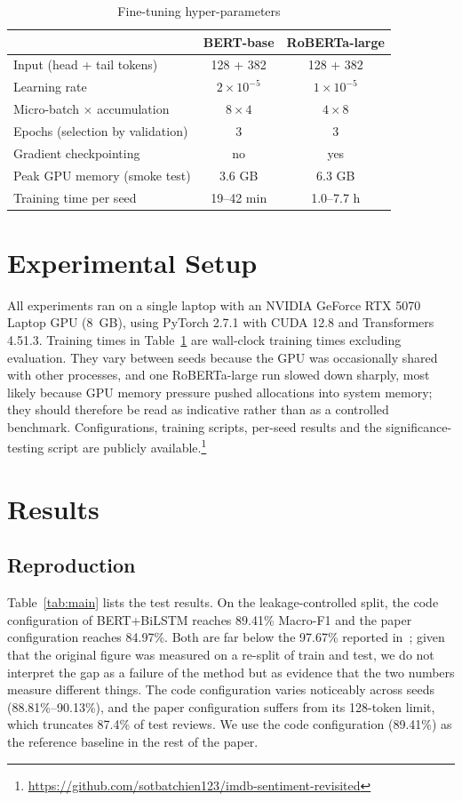 \documentclass[conference]{IEEEtran}
\begin{document}
\begin{table}[t]
\caption{Fine-tuning hyper-parameters}
\label{tab:hparams}
\centering
\begin{tabular}{lcc}
\toprule
 & BERT-base & RoBERTa-large \\
\midrule
Input (head + tail tokens) & 128 + 382 & 128 + 382 \\
Learning rate & $2\times10^{-5}$ & $1\times10^{-5}$ \\
Micro-batch $\times$ accumulation & $8\times4$ & $4\times8$ \\
Epochs (selection by validation) & 3 & 3 \\
Gradient checkpointing & no & yes \\
Peak GPU memory (smoke test) & 3.6 GB & 6.3 GB \\
Training time per seed & 19--42 min & 1.0--7.7 h \\
\bottomrule
\end{tabular}
\end{table}

\section{Experimental Setup}
All experiments ran on a single laptop with an NVIDIA GeForce RTX 5070 Laptop GPU (8~GB), using PyTorch 2.7.1 with CUDA 12.8 and Transformers 4.51.3. Training times in Table~\ref{tab:hparams} are wall-clock training times excluding evaluation. They vary between seeds because the GPU was occasionally shared with other processes, and one RoBERTa-large run slowed down sharply, most likely because GPU memory pressure pushed allocations into system memory; they should therefore be read as indicative rather than as a controlled benchmark. Configurations, training scripts, per-seed results and the significance-testing script are publicly available.\footnote{\url{https://github.com/sotbatchien123/imdb-sentiment-revisited}}

\section{Results}

\subsection{Reproduction}
Table~\ref{tab:main} lists the test results. On the leakage-controlled split, the code configuration of BERT+BiLSTM reaches 89.41\% Macro-F1 and the paper configuration reaches 84.97\%. Both are far below the 97.67\% reported in~\cite{nkhata2023}; given that the original figure was measured on a re-split of train and test, we do not interpret the gap as a failure of the method but as evidence that the two numbers measure different things. The code configuration varies noticeably across seeds (88.81\%--90.13\%), and the paper configuration suffers from its 128-token limit, which truncates 87.4\% of test reviews. We use the code configuration (89.41\%) as the reference baseline in the rest of the paper.
\end{document}
